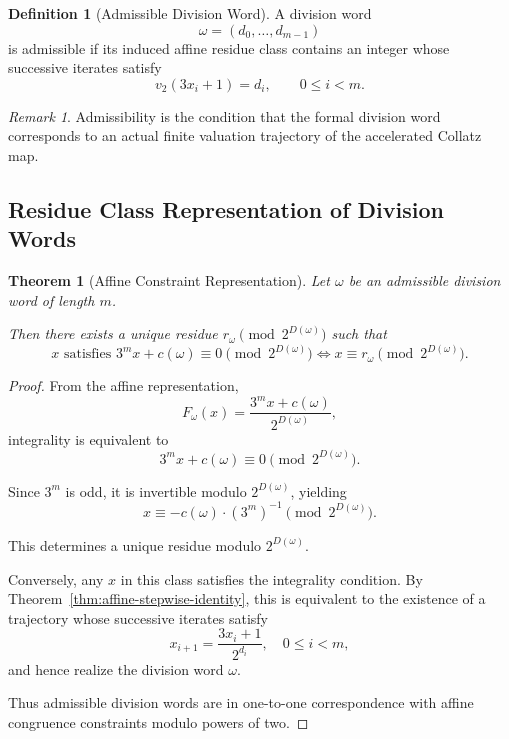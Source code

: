 \documentclass[12pt, oneside]{article}
\numberwithin{equation}{section}
\theoremstyle{definition}
\newtheorem{definition}{Definition}[section]
\theoremstyle{plain}
\newtheorem{theorem}{Theorem}[section]
\theoremstyle{remark}
\newtheorem*{remark}{Remark}
\begin{document}
\begin{definition}[Admissible Division Word]
\label{def:admissible-division-word}
A division word
\[
\omega=(d_0,\dots,d_{m-1})
\]
is admissible if its induced affine residue class contains an integer
whose successive iterates satisfy
\[
v_2(3x_i+1)=d_i,
\qquad 0\le i<m.
\]
\end{definition}

\begin{remark}
Admissibility is the condition that the formal division word corresponds
to an actual finite valuation trajectory of the accelerated Collatz map.
\end{remark}

\subsection{Residue Class Representation of Division Words}

\begin{theorem}[Affine Constraint Representation]
Let $\omega$ be an admissible division word of length $m$.

Then there exists a unique residue $r_\omega \pmod{2^{D(\omega)}}$ such that
\[
x \text{ satisfies } 3^m x + c(\omega) \equiv 0 \pmod{2^{D(\omega)}}
\iff
x \equiv r_\omega \pmod{2^{D(\omega)}}.
\]
\end{theorem}

\begin{proof}
From the affine representation,
\[
F_\omega(x) = \frac{3^m x + c(\omega)}{2^{D(\omega)}},
\]
integrality is equivalent to
\[
3^m x + c(\omega) \equiv 0 \pmod{2^{D(\omega)}}.
\]

Since $3^m$ is odd, it is invertible modulo $2^{D(\omega)}$, yielding
\[
x \equiv -c(\omega) \cdot (3^m)^{-1} \pmod{2^{D(\omega)}}.
\]

This determines a unique residue modulo $2^{D(\omega)}$.

Conversely, any $x$ in this class satisfies the integrality condition.
By Theorem~\ref{thm:affine-stepwise-identity}, this is equivalent to the
existence of a trajectory whose successive iterates satisfy
\[
x_{i+1} = \frac{3x_i+1}{2^{d_i}}, \quad 0 \le i < m,
\]
and hence realize the division word $\omega$.

Thus admissible division words are in one-to-one correspondence with affine
congruence constraints modulo powers of two.
\end{proof}
\end{document}
